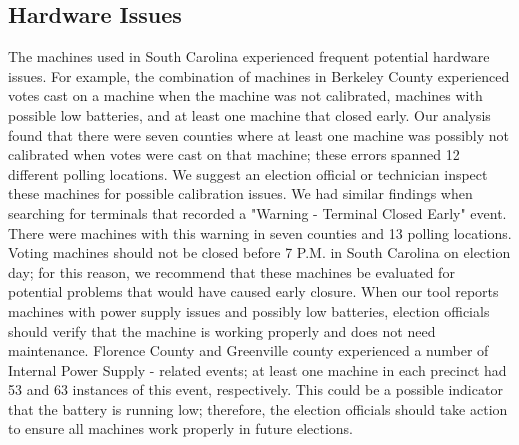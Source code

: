 \subsection{Hardware Issues}
The machines used in South Carolina experienced frequent potential hardware issues.  For example, the combination of machines in Berkeley County experienced votes cast on a machine when the machine was not calibrated, machines with possible low batteries, and at least one machine that closed early.  Our analysis found that there were seven counties where at least one machine was possibly not calibrated when votes were cast on that machine; these errors spanned 12 different polling locations.  We suggest an election official or technician inspect these machines for possible calibration issues.  We had similar findings when searching for terminals that recorded a "Warning - Terminal Closed Early" event.  There were machines with this warning in seven counties and 13 polling locations.  Voting machines should not be closed before 7 P.M. in South Carolina on election day; for this reason, we recommend that these machines be evaluated for potential problems that would have caused early closure.  When our tool reports machines with power supply issues and possibly low batteries, election officials should verify that the machine is working properly and does not need maintenance.  Florence County and Greenville county experienced a number of Internal Power Supply - related events; at least one machine in each precinct had 53 and 63 instances of this event, respectively.  This could be a possible indicator that the battery is running low; therefore, the election officials should take action to ensure all machines work properly in future elections.

